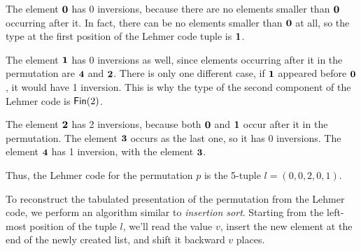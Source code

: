 
The element $\mathbf{0}$ has 0 inversions, because there are no elements smaller
than $\mathbf{0}$ occurring after it. In fact, there can be no elements smaller than
$\mathbf{0}$ at all, so the type at the first position of the Lehmer code tuple is
${\mathbf{1}}$.

The element $\mathbf{1}$ has 0 inversions as well, since elements occurring after it
in the permutation are $\mathbf{4}$ and $\mathbf{2}$. There is only one different case,
if $\mathbf{1}$ appeared before $\mathbf{0}$, it would have 1 inversion. This is why the
type of the second component of the Lehmer code is $\Fin[2]$.

The element $\mathbf{2}$ has 2 inversions, because both $\mathbf{0}$ and $\mathbf{1}$ occur
after it in the permutation. The element $\mathbf{3}$ occurs as the last one, so it
has 0 inversions. The element $\mathbf{4}$ has 1 inversion, with the element
$\mathbf{3}$.

Thus, the Lehmer code for the permutation $p$ is the 5-tuple
$l = (0, 0, 2, 0, 1)$.

To reconstruct the tabulated presentation of the permutation from the Lehmer
code, we perform an algorithm similar to \emph{insertion sort}. Starting from
the left-most position of the tuple $l$, we'll read the value $v$, insert the
new element at the end of the newly created list, and shift it backward $v$
places.

